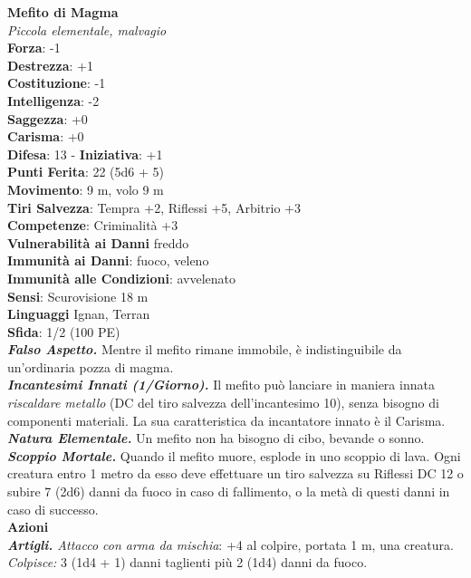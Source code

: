 \begin{multicols}{2}
\medskip\textbf{Mefito di Magma}\\
\emph{Piccola elementale, malvagio}\\
\textbf{Forza}: -1\\
\textbf{Destrezza}: +1\\
\textbf{Costituzione}: -1\\
\textbf{Intelligenza}: -2\\
\textbf{Saggezza}: +0\\
\textbf{Carisma}: +0\\
\textbf{Difesa}: 13 - \textbf{Iniziativa}: +1\\
\textbf{Punti Ferita}: 22 (5d6 + 5)\\
\textbf{Movimento}: 9 m, volo 9 m\\
\textbf{Tiri Salvezza}: Tempra +2, Riflessi +5, Arbitrio +3\\
\textbf{Competenze}: Criminalità +3\\
\textbf{Vulnerabilità ai Danni} freddo\\
\textbf{Immunità ai Danni}: fuoco, veleno\\
\textbf{Immunità alle Condizioni}: avvelenato\\
\textbf{Sensi}: Scurovisione 18 m\\
\textbf{Linguaggi} Ignan, Terran\\
\textbf{Sfida}: 1/2 (100 PE)\smallskip\\
\emph{\textbf{Falso Aspetto.}} Mentre il mefito rimane immobile, è indistinguibile da un'ordinaria pozza di magma.\\
\emph{\textbf{Incantesimi Innati (1/Giorno).}} Il mefito può lanciare in maniera innata \emph{riscaldare metallo} (DC del tiro salvezza dell'incantesimo 10), senza bisogno di componenti materiali. La sua caratteristica da incantatore innato è il Carisma.\\
\emph{\textbf{Natura Elementale.}} Un mefito non ha bisogno di cibo, bevande o sonno.\\
\emph{\textbf{Scoppio Mortale.}} Quando il mefito muore, esplode in uno scoppio di lava. Ogni creatura entro 1 metro da esso deve effettuare un tiro salvezza su Riflessi DC  12 o subire 7 (2d6) danni da fuoco in caso di fallimento, o la metà di questi danni in caso di successo.\\
\smallskip\textbf{Azioni}\\
\emph{\textbf{Artigli.} Attacco con arma da mischia}: +4 al colpire, portata 1 m, una creatura.\\
\emph{Colpisce:} 3 (1d4 + 1) danni taglienti più 2 (1d4) danni da fuoco.\\

\end{multicols}
